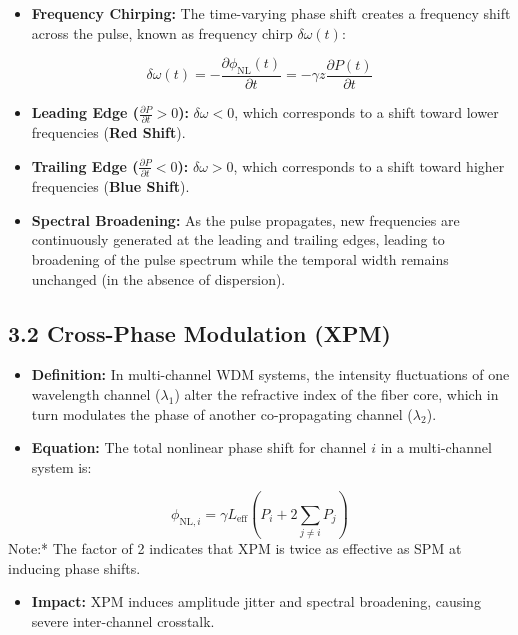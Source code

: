 \begin{itemize}
  \item   \textbf{Frequency Chirping:} The time-varying phase shift creates a frequency shift across the pulse, known as frequency chirp $\delta\omega(t)$:
\end{itemize}
    \[ \delta\omega(t) = -\frac{\partial \phi_{\text{NL}}(t)}{\partial t} = -\gamma z \frac{\partial P(t)}{\partial t} \]
\begin{itemize}
  \item   \textbf{Leading Edge ($\frac{\partial P}{\partial t} > 0$):} $\delta\omega < 0$, which corresponds to a shift toward lower frequencies (\textbf{Red Shift}).
  \item   \textbf{Trailing Edge ($\frac{\partial P}{\partial t} < 0$):} $\delta\omega > 0$, which corresponds to a shift toward higher frequencies (\textbf{Blue Shift}).
  \item   \textbf{Spectral Broadening:} As the pulse propagates, new frequencies are continuously generated at the leading and trailing edges, leading to broadening of the pulse spectrum while the temporal width remains unchanged (in the absence of dispersion).
\end{itemize}


\subsection{3.2 Cross-Phase Modulation (XPM)}
\begin{itemize}
  \item   \textbf{Definition:} In multi-channel WDM systems, the intensity fluctuations of one wavelength channel ($\lambda_1$) alter the refractive index of the fiber core, which in turn modulates the phase of another co-propagating channel ($\lambda_2$).
  \item   \textbf{Equation:} The total nonlinear phase shift for channel $i$ in a multi-channel system is:
\end{itemize}
    \[ \phi_{\text{NL},i} = \gamma L_{\text{eff}} \left( P_i + 2 \sum_{j \neq i} P_j \right) \]
    \textit{   }Note:* The factor of 2 indicates that XPM is twice as effective as SPM at inducing phase shifts.
\begin{itemize}
  \item   \textbf{Impact:} XPM induces amplitude jitter and spectral broadening, causing severe inter-channel crosstalk.
\end{itemize}


